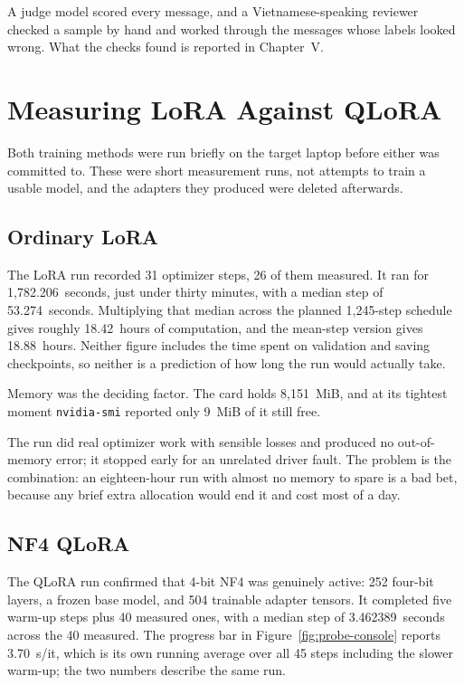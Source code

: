 A judge model scored every message, and a Vietnamese-speaking reviewer checked a sample by hand and worked through the messages whose labels looked wrong. What the checks found is reported in Chapter~V.

\section{Measuring LoRA Against QLoRA}

Both training methods were run briefly on the target laptop before either was committed to. These were short measurement runs, not attempts to train a usable model, and the adapters they produced were deleted afterwards.

\subsection{Ordinary LoRA}

The LoRA run recorded 31 optimizer steps, 26 of them measured. It ran for 1{,}782.206~seconds, just under thirty minutes, with a median step of 53.274~seconds. Multiplying that median across the planned 1{,}245-step schedule gives roughly 18.42~hours of computation, and the mean-step version gives 18.88~hours. Neither figure includes the time spent on validation and saving checkpoints, so neither is a prediction of how long the run would actually take.

Memory was the deciding factor. The card holds 8{,}151~MiB, and at its tightest moment \texttt{nvidia-smi} reported only 9~MiB of it still free.

The run did real optimizer work with sensible losses and produced no out-of-memory error; it stopped early for an unrelated driver fault. The problem is the combination: an eighteen-hour run with almost no memory to spare is a bad bet, because any brief extra allocation would end it and cost most of a day.

\subsection{NF4 QLoRA}

The QLoRA run confirmed that 4-bit NF4 was genuinely active: 252 four-bit layers, a frozen base model, and 504 trainable adapter tensors. It completed five warm-up steps plus 40 measured ones, with a median step of 3.462389~seconds across the 40 measured. The progress bar in Figure~\ref{fig:probe-console} reports 3.70~s/it, which is its own running average over all 45 steps including the slower warm-up; the two numbers describe the same run.

